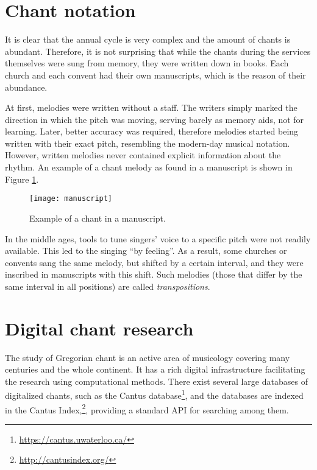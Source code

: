 \section{Chant notation}
\label{section:notation}

It is clear that the annual cycle is very complex and the amount of chants is abundant. Therefore, it is not surprising that while the chants during the
services themselves were sung from memory, they were written down in books. Each church and each convent had their own manuscripts, which is the
reason of their abundance.

At first, melodies were written without a staff. The writers simply marked the direction in which the pitch was moving, serving barely as memory aids,
not for learning. Later, better accuracy was required,
therefore melodies started being written with their exact pitch, resembling the modern-day musical notation. However, written melodies never contained
explicit information about the rhythm. An example of a chant melody as found in a manuscript is shown in Figure \ref{fig:chant}.

\begin{figure}[h]
\centering
\texttt{[image: manuscript]}
\caption{Example of a chant in a manuscript. \cite[id~007553]{cantus_db}}
\label{fig:chant}
\end{figure}

In the middle ages, tools to tune singers' voice to a specific pitch were not readily available. This led to the singing ``by feeling''. As a result,
some churches or convents sang the same melody, but shifted by a certain interval, and they were inscribed in manuscripts with this shift. Such melodies
(those that differ by the same interval in all positions) are called \emph{transpositions}.

\section{Digital chant research}

The study of Gregorian chant is an active area of musicology covering many centuries and the whole continent. It has a rich digital infrastructure facilitating
the research using computational methods. There exist several large databases of digitalized chants, such as the Cantus database\footnote{\url{https://cantus.uwaterloo.ca/}},
and the databases are indexed in the Cantus Index,\footnote{\url{http://cantusindex.org/}}, providing a standard API for searching among them.

